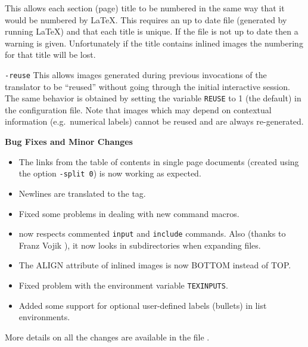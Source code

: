 \begin{htmllist}
\begin{htmllist}
This allows each section (page) title to be numbered in the same 
way that it would be numbered by \LaTeX. This requires 
an up to date  file (generated by running \LaTeX) and that 
each title is unique. If the  file is not up to date then a 
warning is given.
Unfortunately if 
the title contains inlined images the numbering for that title will
be lost. 
\item[\texttt{-reuse}]
This allows images generated during previous invocations of
the translator to be ``reused'' without going through the initial 
interactive session. The same behavior is obtained by setting
the variable \texttt{REUSE} to 1 (the default) in the configuration file.
Note that images which may depend on contextual information (e.g.\ numerical
labels) cannot be reused and are always re-generated. 
\end{htmllist}
\item[\textbf{Bug Fixes and Minor Changes}] \hfill
\begin{itemize}
\item The links from the table of contents in single page documents (created using
the option \texttt{-split 0}) is now working as expected.
\item Newlines are translated to the  tag.
\item Fixed some problems in dealing with new command macros.
\item {} now respects commented \texttt{input} and 
\texttt{include} commands. Also (thanks to Franz Vojik
), it 
now looks in subdirectories when expanding
files.
\item The ALIGN attribute of inlined images is now BOTTOM instead of
TOP.
\item Fixed problem with the environment variable \texttt{TEXINPUTS}.
\item Added some support for optional user-defined labels (bullets) in
list environments.
\end{itemize}
\end{htmllist}

More details on all the changes are available in the file 
.

